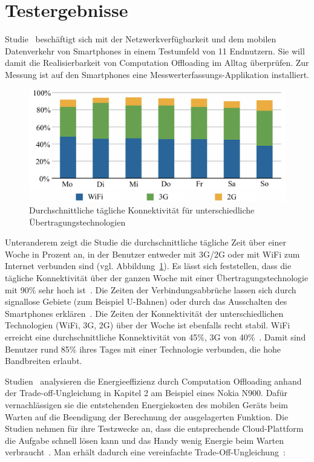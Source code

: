 \documentclass{sigchi}
\begin{document}
\section{Testergebnisse}

Studie~\cite{o2} beschäftigt sich mit der Netzwerkverfügbarkeit und dem mobilen Datenverkehr von Smartphones in einem Testumfeld von 11 Endnutzern.
Sie will damit die Realisierbarkeit von Computation Offloading im Alltag überprüfen.
Zur Messung ist auf den Smartphones eine Messwerterfassungs-Applikation installiert.

\begin{figure}
\centering
  \includegraphics[width=1.0\columnwidth]{images/konnektivitaet}
  \caption{Durchschnittliche tägliche Konnektivität für unterschiedliche Übertragungstechnologien~\protect\cite{o2}} \label{fig:konnektivitaet}
\end{figure}

Unteranderem zeigt die Studie die durchschnittliche tägliche Zeit über einer Woche in Prozent an, in der Benutzer entweder mit 3G/2G oder mit WiFi zum Internet verbunden sind (vgl. Abbildung~\ref{fig:konnektivitaet}).
Es lässt sich feststellen, dass die tägliche Konnektivität über der ganzen Woche mit einer Übertragungstechnologie mit 90\% sehr hoch ist~\cite{o2}.
Die Zeiten der Verbindungsabbrüche lassen sich durch signallose Gebiete (zum Beispiel U-Bahnen) oder durch das Ausschalten des Smartphones erklären~\cite{o2}.
Die Zeiten der Konnektivität der unterschiedlichen Technologien (WiFi, 3G, 2G) über der Woche ist ebenfalls recht stabil.
WiFi erreicht eine durchschnittliche Konnektivität von 45\%, 3G von 40\%~\cite{o2}.
Damit sind Benutzer rund 85\% ihres Tages mit einer Technologie verbunden, die hohe Bandbreiten erlaubt.

Studien~\cite{o8, o12} analysieren die Energieeffizienz durch Computation Offloading anhand der Trade-off-Ungleichung in Kapitel 2 am Beispiel eines Nokia N900.
Dafür vernachlässigen sie die entstehenden Energiekosten des mobilen Geräts beim Warten auf die Beendigung der Berechnung der ausgelagerten Funktion.
Die Studien nehmen für ihre Testzwecke an, dass die entsprechende Cloud-Plattform die Aufgabe schnell lösen kann und das Handy wenig Energie beim Warten verbraucht~\cite{o8}.
Man erhält dadurch eine vereinfachte Trade-Off-Ungleichung~\cite{o8}:
\end{document}
